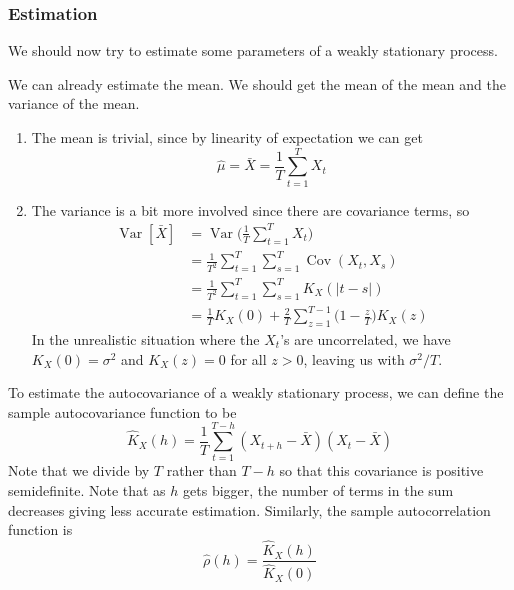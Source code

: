 \documentclass{article}
\DeclareMathOperator{\Cov}{Cov}
\DeclareMathOperator{\Var}{Var}
\begin{document}
  \subsubsection{Estimation}

    We should now try to estimate some parameters of a weakly stationary process. 

    \begin{theorem}
      \label{thm:sampling-distribution-of-mean}
      We can already estimate the mean. We should get the mean of the mean and the variance of the mean. 
      \begin{enumerate}
        \item The mean is trivial, since by linearity of expectation we can get 
          \begin{equation}
            \hat{\mu} = \bar{X} = \frac{1}{T} \sum_{t=1}^T X_t
          \end{equation}

        \item The variance is a bit more involved since there are covariance terms, so 
          \begin{align}
            \Var[\bar{X}] & = \Var \bigg( \frac{1}{T} \sum_{t=1}^T X_t \bigg) \\
                          & = \frac{1}{T^2} \sum_{t=1}^T \sum_{s=1}^T \Cov(X_t, X_s) \\
                          & = \frac{1}{T^2} \sum_{t=1}^T \sum_{s=1}^T K_X (|t - s|) \\
                          & = \frac{1}{T} K_X (0) + \frac{2}{T} \sum_{z=1}^{T-1} \Big(1 - \frac{z}{T} \Big) K_X (z)
          \end{align} 
          In the unrealistic situation where the $X_t$'s are uncorrelated, we have $K_X (0) = \sigma^2$ and $K_X (z) = 0$ for all $z > 0$, leaving us with $\sigma^2 / T$. 
      \end{enumerate}
    \end{theorem}

    \begin{theorem}
      \label{thm:sampling-distribution-of-autocovariance}
      To estimate the autocovariance of a weakly stationary process, we can define the sample autocovariance function to be
      \begin{equation}
        \hat{K}_X (h) = \frac{1}{T} \sum_{t=1}^{T-h} (X_{t+h} - \bar{X}) (X_t - \bar{X})
      \end{equation}
      Note that we divide by $T$ rather than $T - h$ so that this covariance is positive semidefinite. Note that as $h$ gets bigger, the number of terms in the sum decreases giving less accurate estimation. Similarly, the sample autocorrelation function is 
      \begin{equation}
        \hat{\rho} (h) = \frac{\hat{K}_X (h)}{\hat{K}_X (0)}
      \end{equation}
    \end{theorem}
\end{document}
